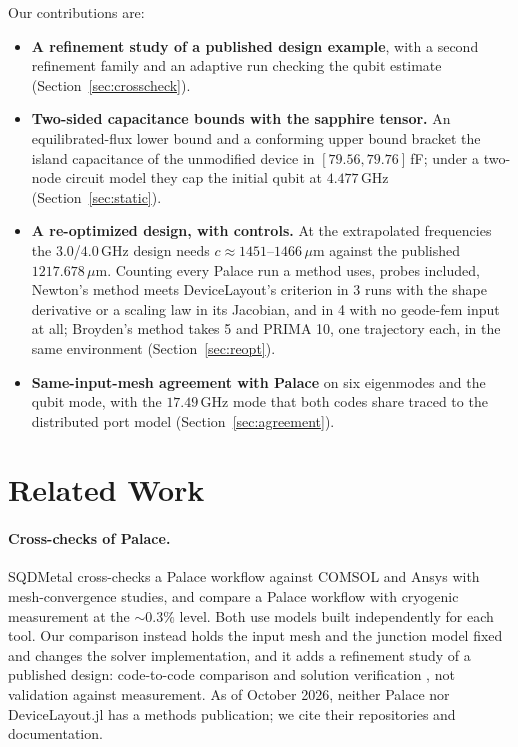\documentclass{anvil-paper}
\begin{document}
Our contributions are:
\begin{itemize}
  \item \textbf{A refinement study of a published design example}, with
    a second refinement family and an adaptive run checking the qubit
    estimate (Section~\ref{sec:crosscheck}).
  \item \textbf{Two-sided capacitance bounds with the sapphire tensor.}
    An equilibrated-flux lower bound and a conforming upper bound bracket
    the island capacitance of the unmodified device in $[79.56,
    79.76]$\,fF; under a two-node circuit model they cap the initial qubit
    at $4.477$\,GHz (Section~\ref{sec:static}).
  \item \textbf{A re-optimized design, with controls.} At the extrapolated
    frequencies the $3.0$/$4.0$\,GHz design needs $c \approx
    1451$--$1466\,\mu$m against the published $1217.678\,\mu$m. Counting
    every Palace run a method uses, probes included, Newton's method meets
    DeviceLayout's criterion in 3 runs with the shape derivative or a
    scaling law in its Jacobian, and in 4 with no geode-fem input at all;
    Broyden's method takes 5 and PRIMA 10, one trajectory each, in the same
    environment (Section~\ref{sec:reopt}).
  \item \textbf{Same-input-mesh agreement with Palace} on six eigenmodes
    and the qubit mode, with the $17.49$\,GHz mode that both codes share
    traced to the distributed port model (Section~\ref{sec:agreement}).
\end{itemize}

\section{Related Work}
\label{sec:related}

\paragraph{Cross-checks of Palace.}
SQDMetal \citep{sommers2025open} cross-checks a Palace workflow against
COMSOL and Ansys with mesh-convergence studies, and
\citet{ye2025electromagnetic} compare a Palace workflow with cryogenic
measurement at the ${\sim}0.3\%$ level. Both use models built
independently for each tool. Our comparison instead holds the input mesh
and the junction model fixed and changes the solver implementation, and it
adds a refinement study of a published design: code-to-code comparison and
solution verification \citep{oberkampf2010verification}, not validation
against measurement. As of October 2026, neither Palace nor DeviceLayout.jl has a
methods publication; we cite their repositories and documentation.
\end{document}
